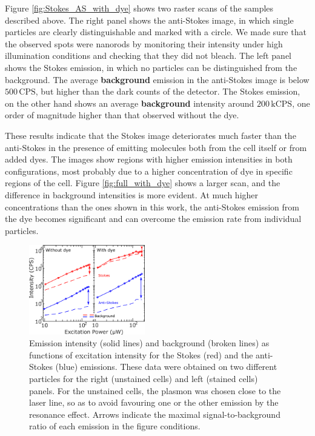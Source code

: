 \documentclass[journal=nalefd,manuscript=letter]{achemso}
\newcommand{\CPS}{\ensuremath{\,\textrm{CPS}}}
\newcommand{\kCPS}{\ensuremath{\,\textrm{kCPS}}}
\begin{document}
Figure \ref{fig:Stokes_AS_with_dye} shows two raster scans of the samples
described above. The right panel shows the anti-Stokes image, in which single
particles are clearly distinguishable and marked with a circle. We made sure
that the observed spots were nanorods by monitoring their intensity under high
illumination conditions and checking that they did not bleach. The left panel
shows the Stokes emission, in which no particles can be distinguished from the
background. The average \textbf{background} emission in the anti-Stokes image is
below $500\CPS$, but higher than the dark counts of the detector. The Stokes
emission, on the other hand shows an average \textbf{background} intensity
around $200\kCPS$, one order of magnitude higher than that observed without the
dye.

These results indicate that the Stokes image deteriorates much faster than the
anti-Stokes in the presence of emitting molecules both from the cell itself or
from added dyes. The images show regions with higher emission intensities in
both configurations, most probably due to a higher concentration of dye in
specific regions of the cell. Figure \ref{fig:full_with_dye} shows a larger
scan, and the difference in background intensities is more evident. At much
higher concentrations than the ones shown in this work, the anti-Stokes emission
from the dye becomes significant and can overcome the emission rate from
individual particles.

\begin{figure}[htp] \centering
\includegraphics[width=0.45\textwidth]{Figures/06_Power_Intensity/power_intensity.png}
\caption{Emission intensity (solid lines) and background (broken lines) as
functions of excitation intensity for the Stokes (red) and the anti-Stokes
(blue) emissions. These data were obtained on two different particles for the
right (unstained cells) and left (stained cells) panels. For the unstained
cells, the plasmon was chosen close to the laser line, so as to avoid favouring
one or the other emission by the resonance effect. Arrows indicate the maximal
signal-to-background ratio of each emission in the figure conditions. }
	\label{fig:power_intensity}
\end{figure}
\end{document}

